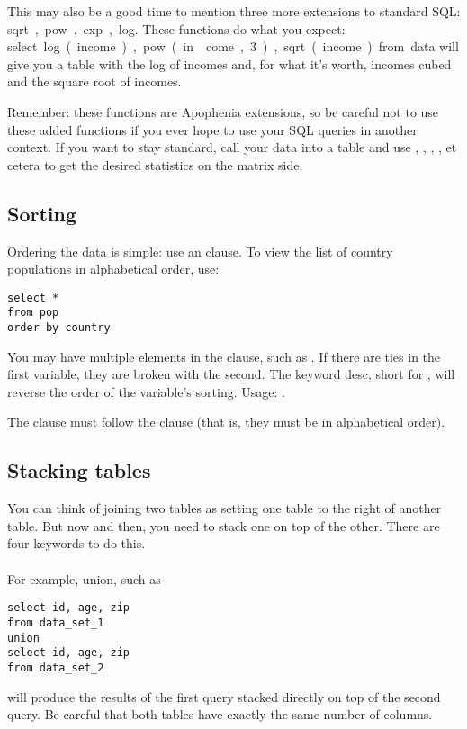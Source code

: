 This may also be a good time to mention three more extensions to standard
SQL: \si{sqrt, pow, exp, log}. These functions do what you expect:
\si{select log(income), pow(in\-come, 3), sqrt(income) from data}
will give you a table with the log of incomes and, for what it's worth,
incomes cubed and the square root of incomes.

Remember: these functions are Apophenia extensions, so be careful not to
use these added functions if you ever hope to use your SQL queries in
another context. If you want to stay standard, call your data into
a table and use , ,
, , et cetera to get the desired
statistics on the matrix side.

\subsection{Sorting} Ordering the data
is simple: use an  clause. To view the list of country
populations in alphabetical order, use:

\begin{lstlisting}
select *
from pop
order by country
\end{lstlisting}
You may have multiple elements in the clause, such as . If there are ties in the first variable, they are broken
with the second. The keyword \si{desc}, short for ,
will reverse the order of the variable's sorting. Usage: .

The  clause must follow the  clause (that is,
they must be in alphabetical order).

\subsection{Stacking tables}
You can think of joining two tables as setting one table to the right of
another table. But now and then, you need to stack one on top of
the other. There are four keywords to do this.

\paragraph{} For example, \si{union}, such as
\begin{lstlisting}
select id, age, zip
from data_set_1
union
select id, age, zip
from data_set_2
\end{lstlisting}
will produce the results of the first query stacked directly on top
of the second query. Be careful that both tables have exactly the same
number of columns.

